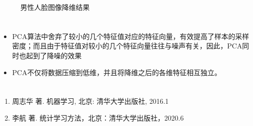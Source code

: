 \documentclass[lang=cn,a4paper,cite=authoryear]{elegantpaper}
\begin{document}
\begin{figure}[H]
	\caption{男性人脸图像降维结果}
	\label{Fig.main}
\end{figure}




\section*{}
\begin{itemize}
\item PCA算法中舍弃了较小的几个特征值对应的特征向量，有效提高了样本的采样密度；而且由于特征值对较小的几个特征向量往往与噪声有关，因此，PCA同时也起到了降噪的效果
\item PCA不仅将数据压缩到低维，并且将降维之后的各维特征相互独立。

\end{itemize}
\section*{}
\begin{enumerate}[(1)]
\item  周志华 著. 机器学习, 北京: 清华大学出版社, 2016.1
\item  李航 著. 统计学习方法，北京：清华大学出版社，2020.6
\end{enumerate}
\end{document}
